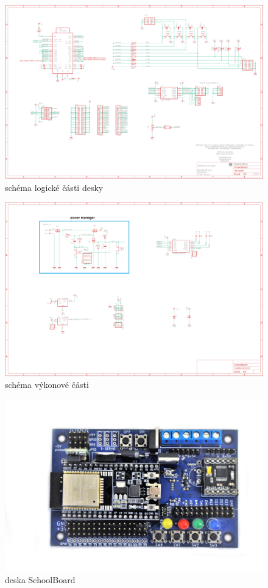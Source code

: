 \documentclass{template/socthesis}
\begin{document}
\begin{figure}[h] 
	\centering
	\includegraphics[width=1.5\textwidth, angle = 90]{img/logika.png}
	\caption{schéma logické části desky}
\end{figure} \label{RB3202sch}

\begin{figure}[h]
	\centering
	\includegraphics[width=1.5\textwidth, angle = 90]{img/silovka.png}
	\caption{schéma výkonové části}
\end{figure}



\begin{figure}[h]
	\centering
	\includegraphics[width=\textwidth]{img/RB3202.JPG}
	\caption{deska SchoolBoard \label{RB3202_obr}}
\end{figure}
\end{document}
